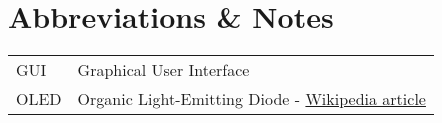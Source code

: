 \section*{Abbreviations \& Notes}
\begin{singlespace}	
	\begin{tabular}{ll}
		GUI    & Graphical User Interface \\
		OLED & Organic Light-Emitting Diode - \href{https://en.wikipedia.org/wiki/OLED}{Wikipedia article} \\
	\end{tabular}
\end{singlespace}